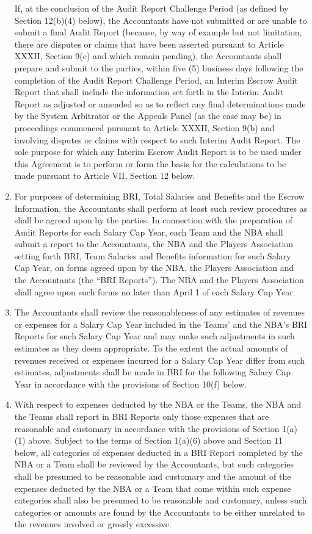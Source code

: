 \documentclass[
]{book}
\begin{document}
\begin{enumerate}
  If, at the conclusion of the Audit Report Challenge Period (as defined by Section 12(b)(4) below), the Accountants have not submitted or are unable to submit a final Audit Report (because, by way of example but not limitation, there are disputes or claims that have been asserted pursuant to Article XXXII, Section 9(c) and which remain pending), the Accountants shall prepare and submit to the parties, within five (5) business days following the completion of the Audit Report Challenge Period, an Interim Escrow Audit Report that shall include the information set forth in the Interim Audit Report as adjusted or amended so as to reflect any final determinations made by the System Arbitrator or the Appeals Panel (as the case may be) in proceedings commenced pursuant to Article XXXII, Section 9(b) and involving disputes or claims with respect to such Interim Audit Report. The sole purpose for which any Interim Escrow Audit Report is to be used under this Agreement is to perform or form the basis for the calculations to be made pursuant to Article VII, Section 12 below.
\item
  For purposes of determining BRI, Total Salaries and Benefits and the Escrow Information, the Accountants shall perform at least such review procedures as shall be agreed upon by the parties. In connection with the preparation of Audit Reports for each Salary Cap Year, each Team and the NBA shall submit a report to the Accountants, the NBA and the Players Association setting forth BRI, Team Salaries and Benefits information for such Salary Cap Year, on forms agreed upon by the NBA, the Players Association and the Accountants (the ``BRI Reports''). The NBA and the Players Association shall agree upon such forms no later than April 1 of each Salary Cap Year.
\item
  The Accountants shall review the reasonableness of any estimates of revenues or expenses for a Salary Cap Year included in the Teams' and the NBA's BRI Reports for such Salary Cap Year and may make such adjustments in such estimates as they deem appropriate. To the extent the actual amounts of revenues received or expenses incurred for a Salary Cap Year differ from such estimates, adjustments shall be made in BRI for the following Salary Cap Year in accordance with the provisions of Section 10(f) below.
\item
  With respect to expenses deducted by the NBA or the Teams, the NBA and the Teams shall report in BRI Reports only those expenses that are reasonable and customary in accordance with the provisions of Section 1(a)(1) above. Subject to the terms of Section 1(a)(6) above and Section 11 below, all categories of expenses deducted in a BRI Report completed by the NBA or a Team shall be reviewed by the Accountants, but such categories shall be presumed to be reasonable and customary and the amount of the expenses deducted by the NBA or a Team that come within such expense categories shall also be presumed to be reasonable and customary, unless such categories or amounts are found by the Accountants to be either unrelated to the revenues involved or grossly excessive.

\end{enumerate}
\end{document}
